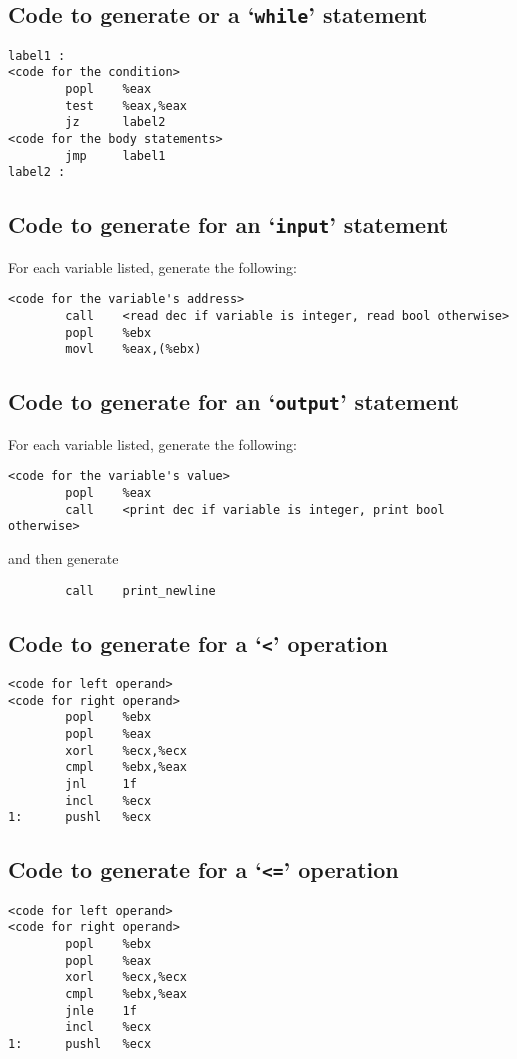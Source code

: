 \documentclass{article}
\begin{document}
\subsection*{Code to generate or a `\texttt{while}' statement}
\begin{verbatim}
label1 :
<code for the condition>
        popl    %eax
        test    %eax,%eax
        jz      label2
<code for the body statements>
        jmp     label1
label2 :
\end{verbatim}

\subsection*{Code to generate for an `\texttt{input}' statement}
For each variable listed, generate the following:
\begin{verbatim}
<code for the variable's address>
        call    <read dec if variable is integer, read bool otherwise>
        popl    %ebx
        movl    %eax,(%ebx)
\end{verbatim}

\subsection*{Code to generate for an `\texttt{output}' statement}
For each variable listed, generate the following:
\begin{verbatim}
<code for the variable's value>
        popl    %eax
        call    <print dec if variable is integer, print bool otherwise>
\end{verbatim}
and then generate
\begin{verbatim}
        call    print_newline
\end{verbatim}


\subsection*{Code to generate for a `\texttt{<}' operation}
\begin{verbatim}
<code for left operand>
<code for right operand>
        popl    %ebx
        popl    %eax
        xorl    %ecx,%ecx
        cmpl    %ebx,%eax
        jnl     1f
        incl    %ecx
1:      pushl   %ecx
\end{verbatim}


\subsection*{Code to generate for a `\texttt{<=}' operation}
\begin{verbatim}
<code for left operand>
<code for right operand>
        popl    %ebx
        popl    %eax
        xorl    %ecx,%ecx
        cmpl    %ebx,%eax
        jnle    1f
        incl    %ecx
1:      pushl   %ecx
\end{verbatim}
\end{document}
